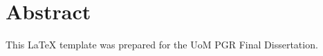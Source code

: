 \newpage 
\thispagestyle{plain} 
\section*{Abstract}
     This LaTeX template was prepared for the UoM PGR Final Dissertation.